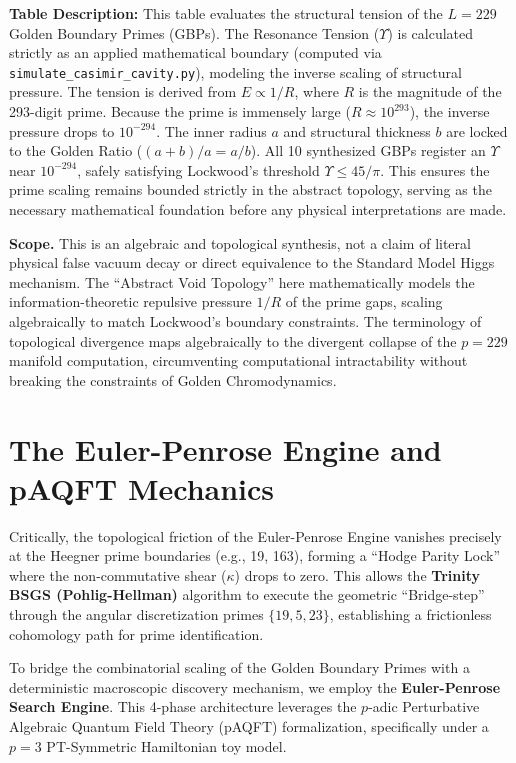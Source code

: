 \textbf{Table Description:} This table evaluates the structural tension of the $L=229$ Golden Boundary Primes (GBPs). The Resonance Tension ($\Upsilon$) is calculated strictly as an applied mathematical boundary (computed via \texttt{simulate\_casimir\_cavity.py}), modeling the inverse scaling of structural pressure. The tension is derived from $E \propto 1/R$, where $R$ is the magnitude of the 293-digit prime. Because the prime is immensely large ($R \approx 10^{293}$), the inverse pressure drops to $10^{-294}$. The inner radius $a$ and structural thickness $b$ are locked to the Golden Ratio ($(a+b)/a = a/b$). All 10 synthesized GBPs register an $\Upsilon$ near $10^{-294}$, safely satisfying Lockwood's threshold $\Upsilon \le 45/\pi$. This ensures the prime scaling remains bounded strictly in the abstract topology, serving as the necessary mathematical foundation before any physical interpretations are made.

\textbf{Scope.} This is an algebraic and topological synthesis, not a claim of literal physical false vacuum decay or direct equivalence to the Standard Model Higgs mechanism. The ``Abstract Void Topology'' here mathematically models the information-theoretic repulsive pressure $1/R$ of the prime gaps, scaling algebraically to match Lockwood's boundary constraints. The terminology of topological divergence maps algebraically to the divergent collapse of the $p=229$ manifold computation, circumventing computational intractability without breaking the constraints of Golden Chromodynamics.

\section{The Euler-Penrose Engine and pAQFT Mechanics}
\label{sec:paqft_mechanics}

Critically, the topological friction of the Euler-Penrose Engine vanishes precisely at the Heegner prime boundaries (e.g., 19, 163), forming a ``Hodge Parity Lock'' where the non-commutative shear ($\kappa$) drops to zero. This allows the \textbf{Trinity BSGS (Pohlig-Hellman)} algorithm to execute the geometric ``Bridge-step'' through the angular discretization primes $\{19, 5, 23\}$, establishing a frictionless cohomology path for prime identification.

To bridge the combinatorial scaling of the Golden Boundary Primes with a deterministic macroscopic discovery mechanism, we employ the \textbf{Euler-Penrose Search Engine}. This 4-phase architecture leverages the $p$-adic Perturbative Algebraic Quantum Field Theory (pAQFT) formalization, specifically under a $p=3$ PT-Symmetric Hamiltonian toy model.

